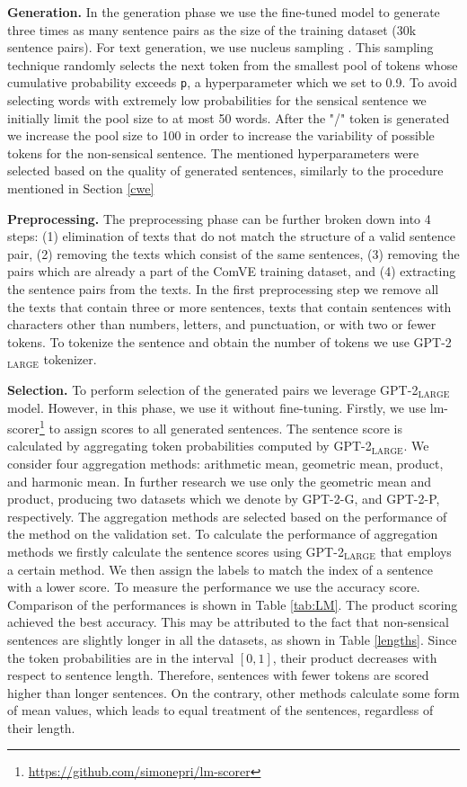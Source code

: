 \documentclass[10pt, a4paper]{article}
\begin{document}
\textbf{Generation.} In the generation phase we use the fine-tuned model to generate three times as many sentence pairs as the size of the training dataset (30k sentence pairs). For text generation, we use nucleus sampling \citep{nucleus}. This sampling technique randomly selects the next token from the smallest pool of tokens whose cumulative probability exceeds \texttt{p}, a hyperparameter which we set to 0.9. To avoid selecting words with extremely low probabilities for the sensical sentence we initially limit the pool size to at most 50 words. After the "/" token is generated we increase the pool size to 100 in order to increase the variability of possible tokens for the non-sensical sentence. The mentioned hyperparameters were selected based on the quality of generated sentences, similarly to the procedure mentioned in Section \ref{cwe}

\textbf{Preprocessing.} The preprocessing phase can be further broken down into 4 steps: (1) elimination of texts that do not match the structure of a valid sentence pair, (2) removing the texts which consist of the same sentences, (3) removing the pairs which are already a part of the ComVE training dataset, and (4) extracting the sentence pairs from the texts. In the first preprocessing step we remove all the texts that contain three or more sentences, texts that contain sentences with characters other than numbers, letters, and punctuation, or with two or fewer tokens. To tokenize the sentence and obtain the number of tokens we use GPT-2$_\text{LARGE}$ tokenizer.

\textbf{Selection.} To perform selection of the generated pairs we leverage GPT-2$_\text{LARGE}$ model. However, in this phase, we use it without fine-tuning. Firstly, we use lm-scorer\footnote{\href{https://github.com/simonepri/lm-scorer}{https://github.com/simonepri/lm-scorer}} to assign scores to all generated sentences. The sentence score is calculated by aggregating token probabilities computed by GPT-2$_\text{LARGE}$. We consider four aggregation methods: arithmetic mean, geometric mean, product, and harmonic mean. In further research we use only the geometric mean and product, producing two datasets which we denote by GPT-2-G, and GPT-2-P, respectively. The aggregation methods are selected based on the performance of the method on the validation set. To calculate the performance of aggregation methods we firstly calculate the sentence scores using GPT-2$_\text{LARGE}$ that employs a certain method. We then assign the labels to match the index of a sentence with a lower score. To measure the performance we use the accuracy score. Comparison of the performances is shown in Table \ref{tab:LM}. The product scoring achieved the best accuracy. This may be attributed to the fact that non-sensical sentences are slightly longer in all the datasets, as shown in Table \ref{lengths}. Since the token probabilities are in the interval $[0, 1]$, their product decreases with respect to sentence length. Therefore, sentences with fewer tokens are scored higher than longer sentences. On the contrary, other methods calculate some form of mean values, which leads to equal treatment of the sentences, regardless of their length.
\end{document}
